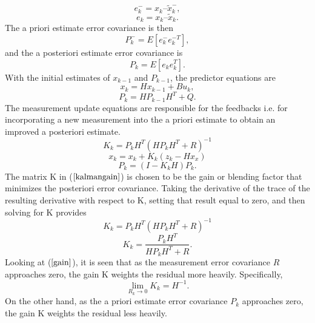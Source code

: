 \documentclass[journal]{IEEEtran}
\begin{document}
\begin{equation}
e_k^- = x_k – \tilde x_k^- ,
\end{equation}
\begin{equation}
e_k =  x_k – \tilde x_k.
\end{equation}
The a priori estimate error covariance is then
\begin{equation}
P_k^- = E[ e_k^- e_k^{-T} ],
\end{equation}
and the a posteriori estimate error covariance is
\begin{equation}
P_k = E[e_k e_k^T].
\end{equation}
With the initial estimates of $x_{k-1}$ and $P_{k-1}$, the predictor equations are
\begin{equation}
x_k = Hx_{k-1} + Bu_k,
\end{equation}
\begin{equation}
P_k = HP_{k-1}H^T + Q.
\end{equation}
The measurement update equations are responsible for the feedbacks
i.e. for incorporating a new measurement into the a priori estimate
to obtain an improved a posteriori estimate.
\begin{equation}
K_k = P_kH^T(HP_kH^T + R)^{-1} \label{kalmangain}
\end{equation}
\begin{equation}
x_k = x_k + K_k(z_k - Hx_x)
\end{equation}
\begin{equation}
P_k = (I-K_kH)P_k.
\end{equation}
The matrix K in ($\ref{kalmangain}$) is
chosen to be the gain or blending factor that minimizes the
posteriori error covariance. Taking the derivative of the trace of
the resulting derivative with respect to K, setting that result equal to zero, and
then solving for K provides
\begin{equation}
K_k = P_kH^{T}(HP_kH^{T} + R)^{-1}
\end{equation}
\begin{equation}
K_k = \dfrac{P_kH^T}{HP_kH^T + R}. \label{gain}
\end{equation}
Looking at ($\ref{gain}$), it is seen that as the measurement error
covariance $R$ approaches zero, the gain K weights the residual more
heavily. Specifically,
\begin{equation}
\mathop {\lim }\limits_{R_k \to 0 } {K_k} = H^{-1}.
\end{equation}
On the other hand, as the a priori estimate error covariance $P_k$
approaches zero, the gain K weights the residual less heavily.
\end{document}
